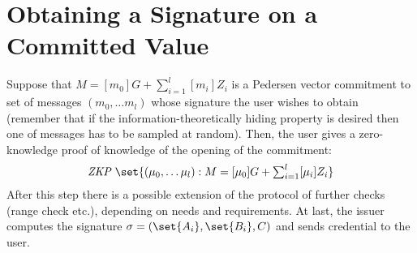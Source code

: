 






\section{Obtaining a Signature on a Committed Value}
Suppose that $M = [m_0]G + \sum_{i=1}^l [m_i]Z_i$ is a Pedersen vector commitment to set of messages $(m_0, \dots m_l)$ whose signature the user wishes to obtain (remember that if the information-theoretically hiding property is desired then one of messages has to be sampled at random). Then, the user gives a zero-knowledge proof of knowledge of the opening of the commitment:
$$ \textstyle \textit{ZKP } \set{(\mu_0, \dots \mu_l): M = [\mu_0]G + \sum_{i=1}^l [\mu_i]Z_i} $$
After this step there is a possible extension of the protocol of further checks (range check etc.), depending on needs and requirements. At last, the issuer computes the signature $\sigma = (\set{A_i}, \set{B_i}, C)$ and sends credential to the user.

